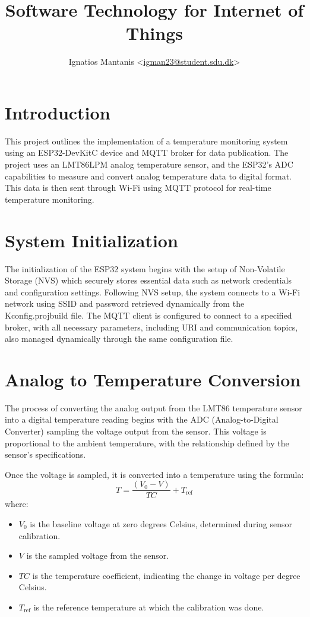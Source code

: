 \documentclass[
  article,
  10pt,
  a4paper,
  oneside,
  openany,
  twocolumn
]{memoir}
\title{Software Technology for Internet of Things\\ \scalebox{0.85}{Portfolio \#2: Temperature Publication}}
\author{Ignatios Mantanis <\href{mailto:igman23@mmmi.sdu.dk}{igman23@student.sdu.dk}>}
\begin{document}
\maketitle

\chapter{Introduction}
This project outlines the implementation of a temperature monitoring system using an ESP32-DevKitC device and MQTT broker for data publication. The project uses an LMT86LPM analog temperature sensor, and the ESP32's ADC capabilities to measure and convert analog temperature data to digital format. This data is then sent through Wi-Fi using MQTT protocol for real-time temperature monitoring.

\chapter{System Initialization}
The initialization of the ESP32 system begins with the setup of Non-Volatile Storage (NVS) which securely stores essential data such as network credentials and configuration settings. Following NVS setup, the system connects to a Wi-Fi network using SSID and password retrieved dynamically from the Kconfig.projbuild file. The MQTT client is configured to connect to a specified broker, with all necessary parameters, including URI and communication topics, also managed dynamically through the same configuration file. 

\chapter{Analog to Temperature Conversion}
The process of converting the analog output from the LMT86 temperature sensor into a digital temperature reading begins with the ADC (Analog-to-Digital Converter) sampling the voltage output from the sensor. This voltage is proportional to the ambient temperature, with the relationship defined by the sensor’s specifications.

Once the voltage is sampled, it is converted into a temperature using the formula:
\[
T = \frac{(V_0 - V)}{TC} + T_{\text{ref}}
\]
where:
\begin{itemize}
    \item \(V_0\) is the baseline voltage at zero degrees Celsius, determined during sensor calibration.
    \item \(V\) is the sampled voltage from the sensor.
    \item \(TC\) is the temperature coefficient, indicating the change in voltage per degree Celsius.
    \item \(T_{\text{ref}}\) is the reference temperature at which the calibration was done.
\end{itemize}
\end{document}
